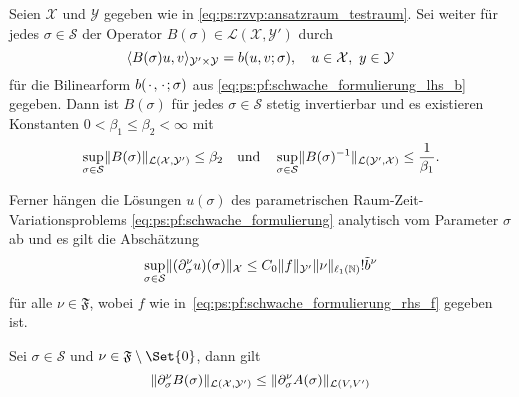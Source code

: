 \begin{Satz}
\label{satz:ps:rg:kunoth13_theorem21}
    Seien $\mathcal X$ und $\mathcal Y$ gegeben wie in \cref{eq:ps:rzvp:ansatzraum_testraum}.
    Sei weiter für jedes $\sigma \in \mathcal S$ der Operator $B(\sigma) \in \mathcal L(\mathcal X, \mathcal Y')$ durch
    \begin{equation}
        \langle B(\sigma) u,v\rangle_{\mathcal Y' \times \mathcal Y} = b(u, v; \sigma), \quad u \in \mathcal X,~y \in \mathcal Y
    \end{equation}
    für die Bilinearform $b({\mkern2mu\cdot\mkern2mu}, {\mkern2mu\cdot\mkern2mu}; \sigma)$ aus \cref{eq:ps:pf:schwache_formulierung_lhs_b} gegeben.
    Dann ist $B(\sigma)$ für jedes $\sigma \in \mathcal S$ stetig invertierbar und es existieren Konstanten $0 < \beta_{1} \leq \beta_{2} < \infty$ mit
    \begin{equation}
        \label{eq:ps:rg:theorem21_abschaetzungen_normen_B_und_B_inv_parametrisch}
        \sup_{\sigma \in \mathcal S} \lVert B(\sigma)\rVert_{\mathcal L(\mathcal X, \mathcal Y')} \leq \beta_{2} \quad \text{und} \quad  \sup_{\sigma \in \mathcal S} \lVert B(\sigma)^{-1}\rVert_{\mathcal L(\mathcal Y', \mathcal X)} \leq \frac{1}{\beta_{1}}.
    \end{equation}

    Ferner hängen die Lösungen $u(\sigma)$ des parametrischen Raum-Zeit-Variationsproblems \cref{eq:ps:pf:schwache_formulierung} analytisch vom Parameter $\sigma$ ab und es gilt die Abschätzung
    \begin{equation}
        \label{eq:ps:rg:theorem21_apriori_schranke}
        \sup_{\sigma \in \mathcal S} \lVert(\partial^{\nu}_{\sigma} u)(\sigma)\rVert_{\mathcal X} \leq C_{0} \lVert f\rVert_{\mathcal Y'} \lVert\nu\rVert_{\ell_{1}(\mathbb{N})}! \tilde{b}^{\nu}
    \end{equation}
    für alle $\nu \in \mathfrak F$, wobei $f$ wie in~\cref{eq:ps:pf:schwache_formulierung_rhs_f} gegeben ist.

    \begin{Beweis}

    \end{Beweis}
\end{Satz}

\begin{Lemma}
\label{lem:ps:rg:norm_B_beschraenkt_durch_norm_A}
    Sei $\sigma \in \mathcal S$ und $\nu \in \mathfrak F \setminus \Set{ 0 }$, dann gilt
    \begin{equation}
        \lVert\partial^{\nu}_{\sigma} B(\sigma)\rVert_{\mathcal L(\mathcal X, \mathcal Y')}
        \leq
        \lVert\partial^{\nu}_{\sigma} A(\sigma)\rVert_{\mathcal L(V, V')}
    \end{equation}

    \begin{Beweis}
    \end{Beweis}
\end{Lemma}
